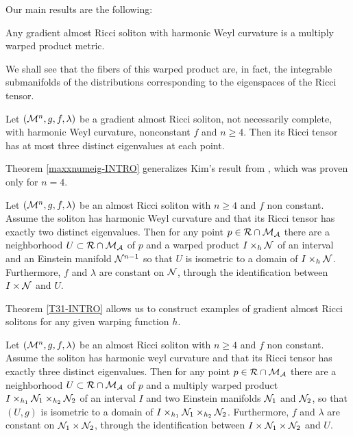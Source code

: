         Our main results are the following:
        

        \begin{teorema}\label{decompwarp-INTRO}
            Any gradient almost Ricci soliton with harmonic Weyl curvature is a multiply warped product metric.
            \end{teorema}

            We shall see that the fibers of this warped product are, in fact, the integrable submanifolds of the distributions corresponding to the eigenspaces of the Ricci tensor.

            \begin{teorema}\label{maxxnumeig-INTRO}
                Let $(\mathcal{M}^n,g,f,\lambda)$ be a gradient almost Ricci soliton, not necessarily complete, with harmonic Weyl curvature, nonconstant $f$ and $n\geq4$. Then its Ricci tensor has at most three distinct eigenvalues at each point.
            \end{teorema}

            Theorem \cref{maxxnumeig-INTRO} generalizes Kim's result from , which was proven only for $n = 4$.


            \begin{teorema}\label{T31-INTRO}
                Let $\left(\mathcal{M}^n, g, f, \lambda\right)$ be an almost Ricci soliton with $n \geq 4$ and $f$ non constant. Assume the soliton has harmonic Weyl curvature and that its Ricci tensor has exactly two distinct eigenvalues. Then for any point $p\in\mathcal{R}\cap \mathcal{M}_{\mathcal{A}}$ there are a neighborhood $U\subset\mathcal{R}\cap \mathcal{M}_{\mathcal{A}}$ of $p$ and a warped product $I \times_{h} \mathcal{N}$ of an interval and an Einstein manifold $\mathcal{N}^{n-1}$ so that $U$ is isometric to a domain of $I \times_{h} \mathcal{N}$. Furthermore, $f$ and $\lambda$ are constant on $\mathcal{N}$, through the identification between $I \times \mathcal{N}$ and $U$.
           \end{teorema}
           
           Theorem \cref{T31-INTRO} allows us to construct examples of gradient almost Ricci solitons for any given warping function $h$. 
           
           
           \begin{teorema}\label{localstrucDuplo-INTRO}
               Let $\left(\mathcal{M}^n, g, f, \lambda\right)$ be an almost Ricci soliton with $n \geq 4$ and $f$ non constant. Assume the soliton has harmonic weyl curvature and that its Ricci tensor has exactly three distinct eigenvalues. Then for any point $p\in\mathcal{R}\cap \mathcal{M}_{\mathcal{A}}$ there are a neighborhood $U\subset\mathcal{R}\cap \mathcal{M}_{\mathcal{A}}$ of $p$ and a multiply warped product $I \times_{h_1} \mathcal{N}_1 \times_{h_2} \mathcal{N}_2$ of an interval $I$ and two Einstein manifolds $\mathcal{N}_1$ and $\mathcal{N}_2$, so that $(U,g)$ is isometric to a domain of $I \times_{h_1} \mathcal{N}_1 \times_{h_2} \mathcal{N}_2$. Furthermore, $f$ and $\lambda$ are constant on $\mathcal{N}_{1}\times\mathcal{N}_{2}$, through the identification between $I\times\mathcal{N}_{1}\times\mathcal{N}_{2}$ and $U$.
               \end{teorema}


